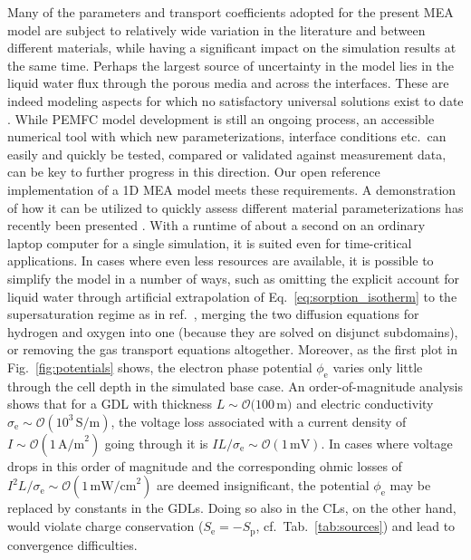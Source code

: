 \documentclass[fontsize=9pt,DIV=calc,a4paper,twocolumn]{scrartcl}
\begin{document}
Many of the parameters and transport coefficients adopted for the present MEA model are subject to relatively wide variation in the literature and between different materials, while having a significant impact on the simulation results at the same time. Perhaps the largest source of uncertainty in the model lies in the liquid water flux through the porous media and across the interfaces. These are indeed modeling aspects for which no satisfactory universal solutions exist to date \cite{weber:14}. While PEMFC model development is still an ongoing process, an accessible numerical tool with which new parameterizations, interface conditions etc.\ can easily and quickly be tested, compared or validated against measurement data, can be key to further progress in this direction. Our open reference implementation of a 1D MEA model meets these requirements. A demonstration of how it can be utilized to quickly assess different material parameterizations has recently been presented \cite{vetter:18}. With a runtime of about a second on an ordinary laptop computer for a single simulation, it is suited even for time-critical applications. In cases where even less resources are available, it is possible to simplify the model in a number of ways, such as omitting the explicit account for liquid water through artificial extrapolation of Eq.~\ref{eq:sorption_isotherm} to the supersaturation regime as in ref.~\cite{springer:91}, merging the two diffusion equations for hydrogen and oxygen into one (because they are solved on disjunct subdomains), or removing the gas transport equations altogether. Moreover, as the first plot in Fig.~\ref{fig:potentials} shows, the electron phase potential $\phi_\mathrm{e}$ varies only little through the cell depth in the simulated base case. An order-of-magnitude analysis shows that for a GDL with thickness $L\sim\mathcal{O}(100\,$\textmu{}m$)$ and electric conductivity $\sigma_\mathrm{e}\sim\mathcal{O}(10^3\,\mathrm{S/m})$, the voltage loss associated with a current density of $I\sim\mathcal{O}(1\,\mathrm{A/m}^2)$ going through it is $IL/\sigma_\mathrm{e}\sim\mathcal{O}(1\,\mathrm{mV})$. In cases where voltage drops in this order of magnitude and the corresponding ohmic losses of $I^2L/\sigma_\mathrm{e}\sim\mathcal{O}(1\,\mathrm{mW/cm}^2)$ are deemed insignificant, the potential $\phi_\mathrm{e}$ may be replaced by constants in the GDLs. Doing so also in the CLs, on the other hand, would violate charge conservation ($S_\mathrm{e}=-S_\mathrm{p}$, cf.\ Tab.~\ref{tab:sources}) and lead to convergence difficulties.
\end{document}
